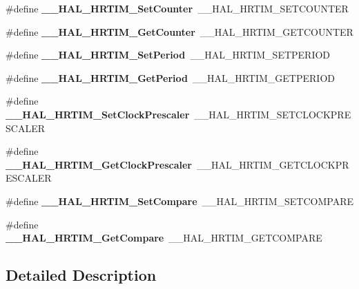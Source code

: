 \begin{DoxyCompactItemize}
\item 
\mbox{\label{group___h_a_l___h_r_t_i_m___aliased___macros_gaa11c36c62453d27a8dd6db62917fb463}} 
\#define {\bfseries \+\_\+\+\_\+\+H\+A\+L\+\_\+\+H\+R\+T\+I\+M\+\_\+\+Set\+Counter}~\+\_\+\+\_\+\+H\+A\+L\+\_\+\+H\+R\+T\+I\+M\+\_\+\+S\+E\+T\+C\+O\+U\+N\+T\+ER
\item 
\mbox{\label{group___h_a_l___h_r_t_i_m___aliased___macros_ga884c22338dec011ab9e4055589c6cd01}} 
\#define {\bfseries \+\_\+\+\_\+\+H\+A\+L\+\_\+\+H\+R\+T\+I\+M\+\_\+\+Get\+Counter}~\+\_\+\+\_\+\+H\+A\+L\+\_\+\+H\+R\+T\+I\+M\+\_\+\+G\+E\+T\+C\+O\+U\+N\+T\+ER
\item 
\mbox{\label{group___h_a_l___h_r_t_i_m___aliased___macros_ga3e6ec773e1fd492d3cc4e9ff84054675}} 
\#define {\bfseries \+\_\+\+\_\+\+H\+A\+L\+\_\+\+H\+R\+T\+I\+M\+\_\+\+Set\+Period}~\+\_\+\+\_\+\+H\+A\+L\+\_\+\+H\+R\+T\+I\+M\+\_\+\+S\+E\+T\+P\+E\+R\+I\+OD
\item 
\mbox{\label{group___h_a_l___h_r_t_i_m___aliased___macros_ga6ca57b361c0d23cb29ed29beddb189a4}} 
\#define {\bfseries \+\_\+\+\_\+\+H\+A\+L\+\_\+\+H\+R\+T\+I\+M\+\_\+\+Get\+Period}~\+\_\+\+\_\+\+H\+A\+L\+\_\+\+H\+R\+T\+I\+M\+\_\+\+G\+E\+T\+P\+E\+R\+I\+OD
\item 
\mbox{\label{group___h_a_l___h_r_t_i_m___aliased___macros_gab5a9ad347b90b2128c7d4fe100758b7d}} 
\#define {\bfseries \+\_\+\+\_\+\+H\+A\+L\+\_\+\+H\+R\+T\+I\+M\+\_\+\+Set\+Clock\+Prescaler}~\+\_\+\+\_\+\+H\+A\+L\+\_\+\+H\+R\+T\+I\+M\+\_\+\+S\+E\+T\+C\+L\+O\+C\+K\+P\+R\+E\+S\+C\+A\+L\+ER
\item 
\mbox{\label{group___h_a_l___h_r_t_i_m___aliased___macros_ga2647242e720056855c36153ef4c19d86}} 
\#define {\bfseries \+\_\+\+\_\+\+H\+A\+L\+\_\+\+H\+R\+T\+I\+M\+\_\+\+Get\+Clock\+Prescaler}~\+\_\+\+\_\+\+H\+A\+L\+\_\+\+H\+R\+T\+I\+M\+\_\+\+G\+E\+T\+C\+L\+O\+C\+K\+P\+R\+E\+S\+C\+A\+L\+ER
\item 
\mbox{\label{group___h_a_l___h_r_t_i_m___aliased___macros_ga3a834f00e6fc6eb601cf28f3ecca47d9}} 
\#define {\bfseries \+\_\+\+\_\+\+H\+A\+L\+\_\+\+H\+R\+T\+I\+M\+\_\+\+Set\+Compare}~\+\_\+\+\_\+\+H\+A\+L\+\_\+\+H\+R\+T\+I\+M\+\_\+\+S\+E\+T\+C\+O\+M\+P\+A\+RE
\item 
\mbox{\label{group___h_a_l___h_r_t_i_m___aliased___macros_ga7db344eedd73f9ceccd648e9d43e6ed7}} 
\#define {\bfseries \+\_\+\+\_\+\+H\+A\+L\+\_\+\+H\+R\+T\+I\+M\+\_\+\+Get\+Compare}~\+\_\+\+\_\+\+H\+A\+L\+\_\+\+H\+R\+T\+I\+M\+\_\+\+G\+E\+T\+C\+O\+M\+P\+A\+RE
\end{DoxyCompactItemize}


\subsection{Detailed Description}
